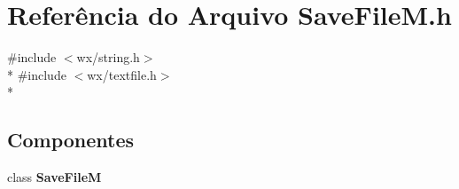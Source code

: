 \section{Referência do Arquivo Save\+File\+M.\+h}
\label{_save_file_m_8h}
{\ttfamily \#include $<$wx/string.\+h$>$}\\*
{\ttfamily \#include $<$wx/textfile.\+h$>$}\\*
\subsection*{Componentes}
\begin{DoxyCompactItemize}
\item 
class {\bf Save\+FileM}
\end{DoxyCompactItemize}
